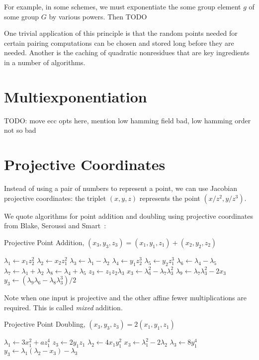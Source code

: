 For example, in some schemes, we must exponentiate the some group element $g$
of some group $G$ by various powers. Then TODO

One trivial application of this principle
is that the random points needed for certain pairing
computations can be chosen and stored long before they are needed.
Another is the caching of quadratic nonresidues that are key
ingredients in a number of algorithms.

\section{Multiexponentiation}

TODO: move ecc opts here, mention low hamming field bad, low hamming
order not so bad

\section {Projective Coordinates}

Instead of using a pair of numbers to represent a point,
we can use Jacobian projective coordinates: the triplet
$(x,y,z)$ represents the point $(x/z^2, y/z^3)$.

We quote algorithms for point addition and doubling using projective
coordinates from Blake, Seroussi and Smart~\cite{bss}:

\begin{algorithm}
\caption{Projective Point Addition, $(x_3, y_3, z_3) = (x_1, y_1, z_1) +
(x_2, y_2, z_2)$}
\begin{algorithmic}[1]
\STATE $\lambda_1 \gets x_1 z_2^2$
\STATE $\lambda_2 \gets x_2 z_1^2$
\STATE $\lambda_3 \gets \lambda_1 - \lambda_2$
\STATE $\lambda_4 \gets y_1 z_2^3$
\STATE $\lambda_5 \gets y_2 z_1^3$
\STATE $\lambda_6 \gets \lambda_4 - \lambda_5$
\STATE $\lambda_7 \gets \lambda_1 + \lambda_2$
\STATE $\lambda_8 \gets \lambda_4 + \lambda_5$
\STATE $z_3 \gets z_1 z_2 \lambda_3$
\STATE $x_3 \gets \lambda_6^2 - \lambda_7 \lambda_3^2$
\STATE $\lambda_9 \gets \lambda_7 \lambda_3^2 - 2x_3$
\STATE $y_3 \gets (\lambda_9 \lambda_6 - \lambda_8\lambda_3^3)/2$
\end{algorithmic}
\end{algorithm}

Note when one input is projective and the other affine fewer multiplications
are required. This is called \emph{mixed} addition.

\begin{algorithm}
\caption{Projective Point Doubling, $(x_3, y_3, z_3) = 2(x_1, y_1, z_1)$}
\begin{algorithmic}[1]
\STATE $\lambda_1 \gets 3x_1^2 +a z_1^4$
\STATE $z_3 \gets 2 y_1 z_1$
\STATE $\lambda_2 \gets 4x_1 y_1^2$
\STATE $x_3 \gets \lambda_1^2 - 2\lambda_2$
\STATE $\lambda_3 \gets 8y_1^4$
\STATE $y_3 \gets \lambda_1(\lambda_2 - x_3)-\lambda_3$
\end{algorithmic}
\end{algorithm}

